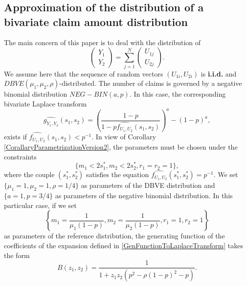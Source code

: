 \subsection{Approximation of the distribution of a bivariate claim amount distribution}\label{BivariateCompoundDistributionExpansion}
The main concern of this paper is to deal with the distribution of 
\begin{equation}\label{BivariateAggregateClaimWithCommonShock}
\left( \begin{array}{l}
Y_1 \\
Y_2 \end{array}
\right)  =
 \displaystyle\sum_{j=1}^{N}
\left( \begin{array}{l}
U_{1j} \\
U_{2j} \end{array}
\right).
\end{equation}
We assume here that the sequence of random vectors $(U_{1i},U_{2i})$ is \textbf{i.i.d.} and $DBVE(\mu_{1},\mu_{2},\rho)$-distributed. The number of claims is governed by a negative binomial distribution $NEG-BIN(a,p)$. In this case, the corresponding bivariate Laplace transform 
\begin{equation}\label{NegBinCompoundBivariateLaplaceTransform}
\widehat{g_{Y_{1},Y_{2}}}(s_{1},s_{2})=\left(\frac{1-p}{1-p\widehat{f_{U_{1},U_{2}}}(s_{1},s_{2})}\right)^{a}-(1-p)^{a},
\end{equation} 
exists if $\widehat{f_{U_{1},U_{2}}}(s_{1},s_{2})<p^{-1}$. In view of Corollary \ref{CorallaryParametrizationVersion2}, the parameters must be chosen under the constraints 
\begin{equation*}
\{m_{1}<2s_{1}^{*},m_{2}<2s_{2}^{*},r_{1}=r_{2}=1\},
\end{equation*}
where the couple $(s_{1}^{*}, s_{2}^{*})$ satisfies the equation $\widehat{f_{U_{1},U_{2}}}(s_{1}^{*},s_{2}^{*})=p^{-1}$. We set $\{\mu_{1}=1,\mu_{2}=1,\rho=1/4\}$ as parameters of the DBVE distribution and $\{a=1,p=3/4\}$ as parameters of the negative binomial distribution. In this particular case, if we set 
\begin{equation*}
\left\{m_{1}=\frac{1}{\mu_{1}(1-p)},m_{2}=\frac{1}{\mu_{2}(1-p)},r_{1}=1,r_{2}=1\right\}
\end{equation*}
as parameters of the reference distribution, the generating function of the coefficients of the expansion defined in \eqref{GenFunctionToLaplaceTransform} takes the form
\begin{equation}\label{CoefficientGeneraitingFunctionCompoundNegBINGDBVE}
B(z_{1},z_{2})=\frac{1}{1+z_{1}z_{2}(p^{2}-\rho(1-p)^{2}-p)}.
\end{equation}
